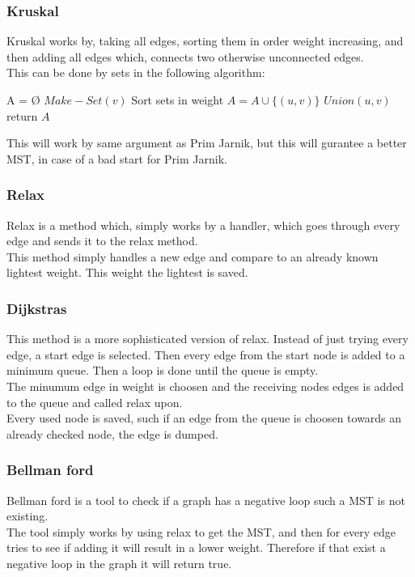 \documentclass[12pt, a4paper]{article}
\begin{document}
			\subsubsection{Kruskal}
				Kruskal works by, taking all edges, sorting them in order weight increasing, and then adding all edges which, connects two otherwise unconnected edges.\\
				This can be done by sets in the following algorithm:
				\begin{algorithmic}[1]
					\State A = Ø
						\State $Make-Set(v)$
					\EndFor
					\State Sort sets in weight 
							\State $A=A\cup \{(u,v)\}$
							\State $Union(u,v)$
						\EndIf
					\EndFor
					\State return $A$
				\end{algorithmic}
				This will work by same argument as Prim Jarnik, but this will gurantee a better MST, in case of a bad start for Prim Jarnik.
			\subsubsection{Relax}
				Relax is a method which, simply works by a handler, which goes through every edge and sends it to the relax method.\\
				This method simply handles a new edge and compare to an already known lightest weight. This weight the lightest is saved.
			\subsubsection{Dijkstras}
				This method is a more sophisticated version of relax. Instead of just trying every edge, a start edge is selected. Then every edge from the start node is added to a minimum queue. Then a loop is done until the queue is empty.\\
				The minumum edge in weight is choosen and the receiving nodes edges is added to the queue and called relax upon.\\
				Every used node is saved, such if an edge from the queue is choosen towards an already checked node, the edge is dumped.\\
			\subsubsection{Bellman ford}
				Bellman ford is a tool to check if a graph has a negative loop such a MST is not existing.\\
				The tool simply works by using relax to get the MST, and then for every edge tries to see if adding it will result in a lower weight. Therefore if that exist a negative loop in the graph it will return true.
						
				
			
				
	
				
\end{document}

